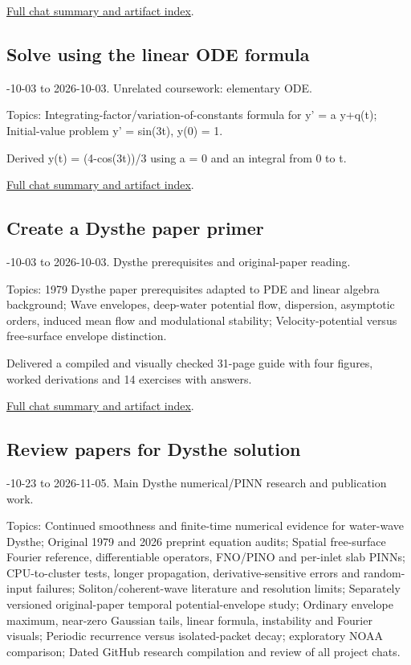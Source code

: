 \documentclass[11pt]{article}
\begin{document}
\nopagebreak[4]
\noindent\href{https://github.com/matasvai/dysthe-research-map/blob/codex/research-record-2026-11-05/research-record/2026-11-05/CHATS.md#chat-01a0fdf3-3700-77a2-85de-29ed2291ff86}{Full chat summary and artifact index}.
\subsection*{Solve using the linear ODE formula}
-10-03 to 2026-10-03. Unrelated coursework: elementary ODE.\par
Topics: Integrating-factor/variation-of-constants formula for y' = a y+q(t); Initial-value problem y' = sin(3t), y(0) = 1.

\noindent Derived y(t) = (4-cos(3t))/3 using a = 0 and an integral from 0 to t.

\nopagebreak[4]
\noindent\href{https://github.com/matasvai/dysthe-research-map/blob/codex/research-record-2026-11-05/research-record/2026-11-05/CHATS.md#chat-01a1036a-88f4-7e20-9ae2-6c25712eef90}{Full chat summary and artifact index}.
\subsection*{Create a Dysthe paper primer}
-10-03 to 2026-10-03. Dysthe prerequisites and original-paper reading.\par
Topics: 1979 Dysthe paper prerequisites adapted to PDE and linear algebra background; Wave envelopes, deep-water potential flow, dispersion, asymptotic orders, induced mean flow and modulational stability; Velocity-potential versus free-surface envelope distinction.

\noindent Delivered a compiled and visually checked 31-page guide with four figures, worked derivations and 14 exercises with answers.

\nopagebreak[4]
\noindent\href{https://github.com/matasvai/dysthe-research-map/blob/codex/research-record-2026-11-05/research-record/2026-11-05/CHATS.md#chat-01a103b0-807b-7c50-a193-f2e7943df5ba}{Full chat summary and artifact index}.
\subsection*{Review papers for Dysthe solution}
-10-23 to 2026-11-05. Main Dysthe numerical/PINN research and publication work.\par
Topics: Continued smoothness and finite-time numerical evidence for water-wave Dysthe; Original 1979 and 2026 preprint equation audits; Spatial free-surface Fourier reference, differentiable operators, FNO/PINO and per-inlet slab PINNs; CPU-to-cluster tests, longer propagation, derivative-sensitive errors and random-input failures; Soliton/coherent-wave literature and resolution limits; Separately versioned original-paper temporal potential-envelope study; Ordinary envelope maximum, near-zero Gaussian tails, linear formula, instability and Fourier visuals; Periodic recurrence versus isolated-packet decay; exploratory NOAA comparison; Dated GitHub research compilation and review of all project chats.
\end{document}

